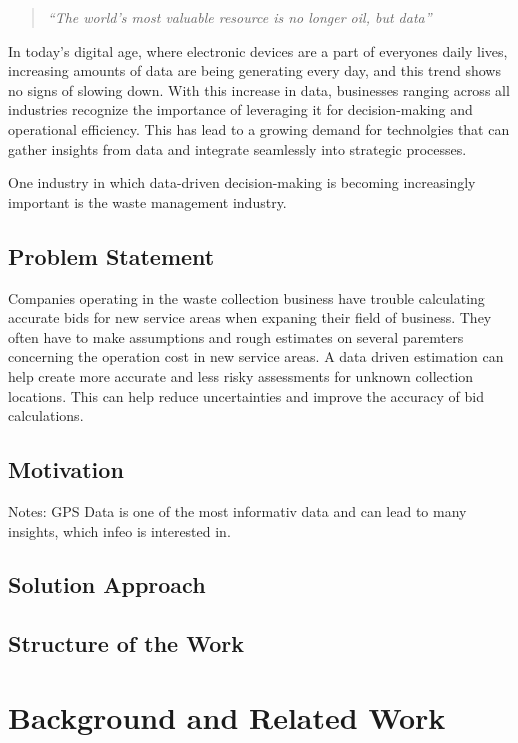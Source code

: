 \documentclass[a4paper,12pt,twoside]{scrreprt}
\begin{document}
\begin{quote}
  \textit{``The world's most valuable resource is no longer oil, but data''}
  \cite{noauthor_worlds_nodate}
\end{quote}
In today's digital age, where electronic devices are a part of everyones daily
lives, increasing amounts of data
are being generating every day, and this trend shows no signs of slowing down.
\cite{petroc_data_nodate}
With this increase in data, businesses ranging across all industries recognize
the importance of leveraging it for decision-making and operational efficiency.
This has lead to a growing demand for technolgies that can gather insights from
data and integrate seamlessly into strategic processes.

One industry in which data-driven decision-making is becoming increasingly
important is the
waste management industry.

\section{Problem Statement}

Companies operating in the waste collection business have trouble calculating
accurate bids for new service areas when expaning their field of business. They
often have to make assumptions and rough estimates on several paremters
concerning the operation cost in new service areas. A data driven estimation
can help create more accurate and less risky assessments for unknown collection
locations. This can help reduce uncertainties and improve the accuracy of bid
calculations.
\section{Motivation}
Notes:
GPS Data is one of the most informativ data and can lead to many insights,
which infeo is interested in.

\section{Solution Approach}

\section{Structure of the Work}

\chapter{Background and Related Work}
\end{document}
